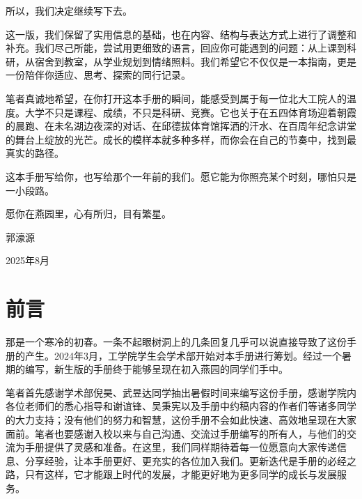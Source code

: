 \vspace{10pt}

所以，我们决定继续写下去。

\vspace{10pt}

这一版，我们保留了实用信息的基础，也在内容、结构与表达方式上进行了调整和补充。我们尽己所能，尝试用更细致的语言，回应你可能遇到的问题：从上课到科研，从宿舍到教室，从学业规划到情绪照料。我们希望它不仅仅是一本指南，更是一份陪伴你适应、思考、探索的同行记录。

\vspace{10pt}

笔者真诚地希望，在你打开这本手册的瞬间，能感受到属于每一位北大工院人的温度。大学不只是课程、成绩，不只是科研、竞赛。它也关于在五四体育场迎着朝霞的晨跑、在未名湖边夜深的对话、在邱德拔体育馆挥洒的汗水、在百周年纪念讲堂的舞台上绽放的光芒。成长的模样本就多种多样，而你会在自己的节奏中，找到最真实的路径。

\vspace{10pt}

这本手册写给你，也写给那个一年前的我们。愿它能为你照亮某个时刻，哪怕只是一小段路。

\vspace{10pt}

愿你在燕园里，心有所归，目有繁星。

\begin{flushright}
	郭濠源
	
	2025年8月
\end{flushright}

\chapter*{前言}
那是一个寒冷的初春。一条不起眼树洞上的几条回复几乎可以说直接导致了这份手册的产生。2024年3月，工学院学生会学术部开始对本手册进行筹划。经过一个暑期的编写，新生版的手册终于能够呈现在初入燕园的同学们手中。

\vspace{10pt}

笔者首先感谢学术部倪昊、武昱达同学抽出暑假时间来编写这份手册，感谢学院内各位老师们的悉心指导和谢谊锋、吴秉宪以及手册中约稿内容的作者们等诸多同学的大力支持；没有他们的努力和智慧，这份手册不会如此快速、高效地呈现在大家面前。笔者也要感谢入校以来与自己沟通、交流过手册编写的所有人，与他们的交流为手册提供了灵感和准备。在这里，我们同样期待着每一位愿意向大家传递信息、分享经验，让本手册更好、更充实的各位加入我们。更新迭代是手册的必经之路，只有这样，它才能跟上时代的发展，才能更好地为更多同学的成长与发展服务。


